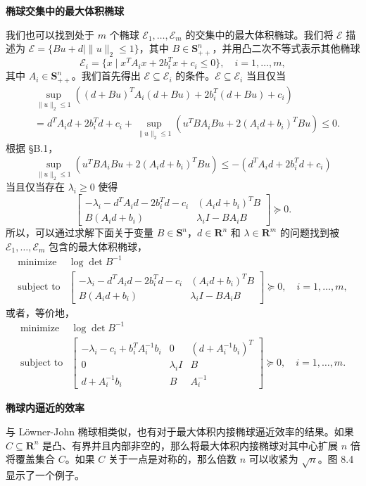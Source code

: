 \documentclass[UTF8,12pt,a4paper,fontset=fandol]{ctexart}
\begin{document}
\noindent\textbf{椭球交集中的最大体积椭球}

我们也可以找到处于 $m$ 个椭球 $\mathcal{E}_1,\ldots,\mathcal{E}_m$ 的交集中的最大体积椭球。我们将 $\mathcal{E}$ 描述为 $\mathcal{E}=\{Bu+d\mid \|u\|_2\leq 1\}$，其中 $B\in\mathbf{S}_{++}^n$，并用凸二次不等式表示其他椭球
\[
\mathcal{E}_i=\{x\mid x^TA_ix+2b_i^Tx+c_i\leq 0\},\quad i=1,\ldots,m,
\]
其中 $A_i\in\mathbf{S}_{++}^n$。我们首先得出 $\mathcal{E}\subseteq \mathcal{E}_i$ 的条件。$\mathcal{E}\subseteq \mathcal{E}_i$ 当且仅当
\[
\begin{split}
&\sup_{\|u\|_2\leq 1}((d+Bu)^TA_i(d+Bu)+2b_i^T(d+Bu)+c_i)\\
&=d^TA_id+2b_i^Td+c_i
+\sup_{\|u\|_2\leq 1}(u^TBA_iBu+2(A_id+b_i)^TBu)\leq 0.
\end{split}
\]
根据 \S B.1，
\[
\sup_{\|u\|_2\leq 1}(u^TBA_iBu+2(A_id+b_i)^TBu)
\leq -(d^TA_id+2b_i^Td+c_i)
\]
当且仅当存在 $\lambda_i\geq 0$ 使得
\[
\begin{bmatrix}
-\lambda_i-d^TA_id-2b_i^Td-c_i & (A_id+b_i)^TB\\
B(A_id+b_i) & \lambda_i I-BA_iB
\end{bmatrix}\succeq 0.
\]
所以，可以通过求解下面关于变量 $B\in\mathbf{S}^n$，$d\in\mathbf{R}^n$ 和 $\lambda\in\mathbf{R}^m$ 的问题找到被 $\mathcal{E}_1,\ldots,\mathcal{E}_m$ 包含的最大体积椭球，
\[
\begin{array}{ll}
\mbox{minimize} & \log\det B^{-1}\\
\mbox{subject to} &
\begin{bmatrix}
-\lambda_i-d^TA_id-2b_i^Td-c_i & (A_id+b_i)^TB\\
B(A_id+b_i) & \lambda_i I-BA_iB
\end{bmatrix}\succeq 0,\quad i=1,\ldots,m,
\end{array}
\]
或者，等价地，
\[
\begin{array}{ll}
\mbox{minimize} & \log\det B^{-1}\\
\mbox{subject to} &
\begin{bmatrix}
-\lambda_i-c_i+b_i^TA_i^{-1}b_i & 0 & (d+A_i^{-1}b_i)^T\\
0 & \lambda_i I & B\\
d+A_i^{-1}b_i & B & A_i^{-1}
\end{bmatrix}\succeq 0,\quad i=1,\ldots,m.
\end{array}
\]

\noindent\textbf{椭球内逼近的效率}

与 Löwner-John 椭球相类似，也有对于最大体积内接椭球逼近效率的结果。如果 $C\subseteq\mathbf{R}^n$ 是凸、有界并且内部非空的，那么将最大体积内接椭球对其中心扩展 $n$ 倍将覆盖集合 $C$。如果 $C$ 关于一点是对称的，那么倍数 $n$ 可以收紧为 $\sqrt{n}$。图 8.4 显示了一个例子。
\end{document}
